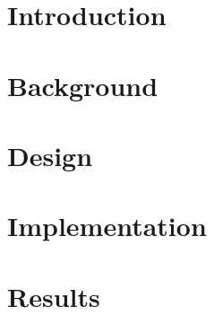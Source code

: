 \documentclass[12pt,twoside]{kau_report}
\begin{document}
\begin{frontmatter}
\begin{acknowledgements}





\end{acknowledgements}
\cleardoublepage

  \tableofcontents
  \cleardoublepage

  \listoffigures
  \cleardoublepage

  \listoftables
  \cleardoublepage
  
  \lstlistoflistings
  \cleardoublepage

\end{frontmatter}

\section{Introduction}
\label{sec:introduction}

\cleardoublepage

\section{Background}
\label{sec:background}

\cleardoublepage

\section{Design}
\label{sec:design}

\cleardoublepage

\section{Implementation}
\label{sec:implementation}

\cleardoublepage

\section{Results} %
\label{sec:resultevaluation}

\cleardoublepage
\end{document}
